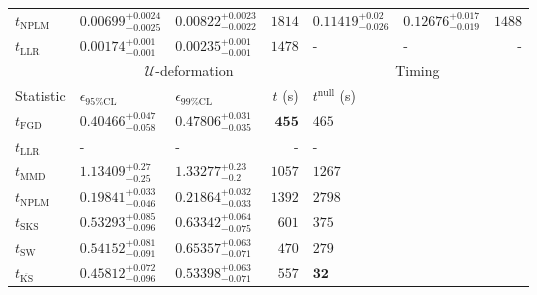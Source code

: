 \begin{tabular}{l|llr|llr}
\rowcolor{red!35}	$t_{\mathrm{NPLM}}$ & $0.00699_{-0.0025}^{+0.0024}$ & $0.00822_{-0.0022}^{+0.0023}$ & $1814$ & $0.11419_{-0.026}^{+0.02}$ & $0.12676_{-0.019}^{+0.017}$ & $1488$ \\
	$t_{\mathrm{LLR}}$ & $0.00174_{-0.001}^{+0.001}$ & $0.00235_{-0.001}^{+0.001}$ & $1478$ & - & - & - \\
	\toprule
	\multicolumn{1}{c}{} & \multicolumn{3}{c}{$\mathcal{U}$-deformation} & \multicolumn{3}{c}{Timing} \\
	Statistic & $\epsilon_{95\%\mathrm{CL}}$ & $\epsilon_{99\%\mathrm{CL}}$ & $t$ (s) & $t^{\mathrm{null}}$ (s) \\
	\midrule
	$t_{\mathrm{FGD}}$ & ${\mathbf{0.40466_{-0.058}^{+0.047}}}$ & ${\mathbf{0.47806_{-0.035}^{+0.031}}}$ & ${\mathbf{455}}$ & $465$ \\
	$t_{\mathrm{LLR}}$ & - & - & - & - \\
	$t_{\mathrm{MMD}}$ & $1.13409_{-0.25}^{+0.27}$ & $1.33277_{-0.2}^{+0.23}$ & $1057$ & $1267$ \\
\rowcolor{red!35}	$t_{\mathrm{NPLM}}$ & $0.19841_{-0.046}^{+0.033}$ & $0.21864_{-0.033}^{+0.032}$ & $1392$ & $2798$ \\
	$t_{\mathrm{SKS}}$ & $0.53293_{-0.096}^{+0.085}$ & $0.63342_{-0.075}^{+0.064}$ & $601$ & $375$ \\
	$t_{\mathrm{SW}}$ & $0.54152_{-0.091}^{+0.081}$ & $0.65357_{-0.071}^{+0.063}$ & $470$ & $279$ \\
	$t_{\overline{\mathrm{KS}}}$ & $0.45812_{-0.096}^{+0.072}$ & $0.53398_{-0.071}^{+0.063}$ & $557$ & ${\mathbf{32}}$ \\
	\bottomrule
\end{tabular}